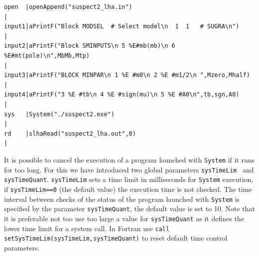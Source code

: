 \documentclass[12pt,a4paper]{article}
\begin{document}
\begin{verbatim}
open  |openAppend("suspect2_lha.in")                                                                                                                                                                                                                             |
input1|aPrintF("Block MODSEL  # Select model\n  1  1   # SUGRA\n")                                                                                                                                                                              |
input2|aPrintF("Block SMINPUTS\n 5 %E#mb(mb)\n 6 %E#mt(pole)\n",MbMb,Mtp)                                                                                                                                                               |
input3|aPrintF("BLOCK MINPAR\n 1 %E #m0\n 2 %E #m1/2\n ",Mzero,Mhalf)                                                                                                                                          |
input4|aPrintF("3 %E #tb\n 4 %E #sign(mu)\n 5 %E #A0\n",tb,sgn,A0)                                                                                                                                          |
sys   |System("./suspect2.exe")                                                                                                                                                                                                                                 |
rd    |slhaRead("suspect2_lha.out",0)                                                                                                                                                                                                                           |
\end{verbatim}

It is possible to cancel the execution of a program launched with  \verb|System|  if it runs for too long. For this we have introduced two
global parameters  {\tt  sysTimeLim } and {\tt  sysTimeQuant}.
{\tt  sysTimeLim} sets a time limit  in milliseconds for {\tt System} execution, if 
{\tt  sysTimeLim==0} (the default value) the execution time is not checked. 
The time interval between checks of the status of the program launched with  \verb|System|  is specified by the parameter
{\tt sysTimeQuant}, the default value is set to 10.  
Note that it is preferable not too use too large a value for {\tt sysTimeQuant} as it defines the lower time limit for a system call. 
In Fortran use \verb|call setSysTimeLim(sysTimeLim,sysTimeQuant)| to reset default time control
parameters. 
\end{document}

